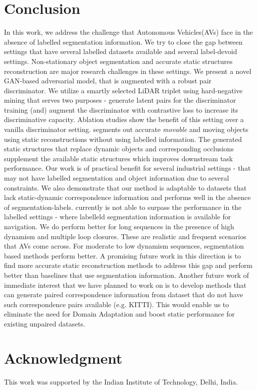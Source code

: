 \section{Conclusion}
In this work, we address the challenge that Autonomous Vehicles(AVs) face in the absence of labelled segmentation information. We try to close the gap between settings that have several labelled datasets available and several label-devoid settings. Non-stationary object segmentation and accurate static structures reconstruction are major research challenges in these settings. We present a novel GAN-based adversarial model, \dslr{} that is augmented with a robust pair discriminator. We utilize a smartly selected LiDAR triplet using hard-negative mining that serves two purposes - generate latent pairs for the discriminator training (and) augment the discriminator with contrastive loss to increase its discriminative capacity. Ablation studies show the benefit of this setting over a vanilla discriminator setting. \dslr{} segments out accurate \textit{movable} and moving objects using static reconstructions without using labelled information. The generated static structures that replace dynamic objects and corresponding occlusions supplement the available static structures which improves downstream task performance. Our work is of practical benefit for several industrial settings - that may not have labelled segmentation and object information due to several constraints. We also demonstrate that our method is adaptable to datasets that lack static-dynamic correspondence information and performs well in the absence of segmentation-labels. \dslr{} currently is not able to surpass the performance in the labelled settings - where labelleld segmentation information is available for navigation. We do perform better for long sequences in the presence of high dynamism and multiple loop closures. These are realistic and frequent scenarios that AVs come across. For moderate to low dynamism sequences, segmentation based methods perform better. A promising future work in this direction is to find more accurate static reconstruction methods to address this gap and perform better than baselines that use segmentation information. Another future work of immediate interest that we have planned to work on is to develop methods that can generate  paired correspondence information from dataset that do not have such correspondence pairs available (e.g. KITTI). This would enable us to eliminate the need for Domain Adaptation and boost static performance for existing unpaired datasets.

\section{Acknowledgment}
This work was supported by the Indian Institute of Technology, Delhi, India.